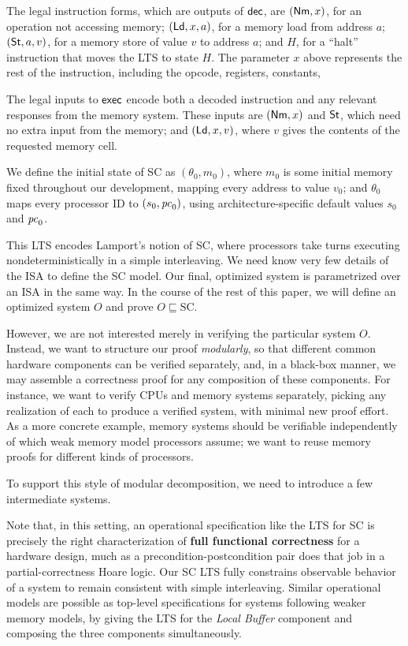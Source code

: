 The legal instruction forms, which are outputs of $\mathsf{dec}$, are $(\mathsf{Nm}, x)$, for
an operation not accessing memory; $(\mathsf{Ld}, x, a)$, for a memory load from
address $a$; $(\mathsf{St}, a, v)$, for a memory store of value $v$ to address $a$; and
$H$, for a ``halt'' instruction that moves the LTS to state $H$. The parameter
$x$ above represents the rest of the instruction, including the
opcode, registers, constants, \etc{}

The legal inputs to $\mathsf{exec}$ encode both a decoded instruction and any relevant
responses from the memory system.  These inputs are $(\mathsf{Nm}, x)$ and $\mathsf{St}$, which
need no extra input from the memory; and $(\mathsf{Ld}, x, v)$, where $v$ gives the
contents of the requested memory cell.

We define the initial state of SC as $(\theta_0, m_0)$, where $m_0$ is
some initial memory fixed throughout our development, mapping every
address to value $v_0$; and $\theta_0$ maps every processor ID to
$(s_0, \mathit{pc}_0)$, using architecture-specific default values $s_0$ and
$\mathit{pc}_0$.


This LTS encodes Lamport's notion of SC, where processors take turns executing
nondeterministically in a simple interleaving.  We need know very few details
of the ISA to define the SC model.  Our final, optimized system is parametrized
over an ISA in the same way.  In the course of the rest of this paper, we will
define an optimized system $O$ and prove $O \sqsubseteq \text{SC}$.

However, we are not interested merely in verifying the particular system $O$.
Instead, we want to structure our proof \emph{modularly}, so that different
common hardware components can be verified separately, and, in a black-box
manner, we may assemble a correctness proof for any composition of these
components.  For instance, we want to verify CPUs and memory systems
separately, picking any realization of each to produce a verified system, with
minimal new proof effort. As a more concrete example, memory systems should be
verifiable independently of which weak memory model processors assume; we want
to reuse memory proofs for different kinds of processors.

To support this style of modular decomposition, we need to introduce a few
intermediate systems.

Note that, in this setting, an operational specification like the LTS
for SC is precisely the right characterization of \textbf{full functional
  correctness} for a hardware design, much as a
precondition-postcondition pair does that job in a partial-correctness
Hoare logic.  Our SC LTS fully constrains observable behavior of a
system to remain consistent with simple interleaving.  Similar
operational models are possible as top-level specifications for
systems following weaker memory models, by giving the LTS for the \emph{Local
Buffer} component and composing the three components simultaneously.

